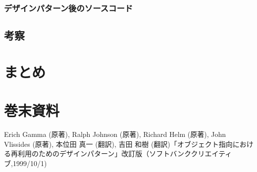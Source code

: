 \documentclass[dvipdfmx]{jsarticle}
\begin{document}
\subsubsection{デザインパターン後のソースコード}
\subsection{考察}
\section{まとめ}
\section{巻末資料}
\begin{thebibliography}{99}
    Erich Gamma (原著), Ralph Johnson (原著), Richard Helm (原著), John Vlissides (原著), 本位田 真一 (翻訳), 吉田 和樹 (翻訳)「オブジェクト指向における再利用のためのデザインパターン」改訂版（ソフトバンククリエイティブ,1999/10/1)
\end{thebibliography}
\end{document}
